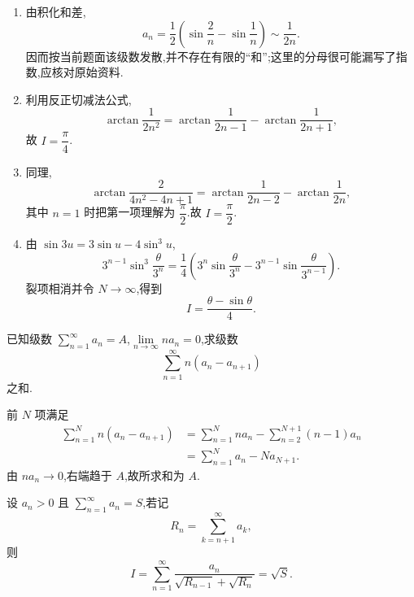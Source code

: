 \begin{solution}
    \leavevmode
    \begin{enumerate}
        \item 由积化和差,
              \[
                  a_n=\dfrac{1}{2}\left(\sin\dfrac{2}{n}-\sin\dfrac{1}{n}\right)
                  \sim\dfrac{1}{2n}.
              \]
              因而按当前题面该级数发散,并不存在有限的``和'';这里的分母很可能漏写了指数,应核对原始资料.
        \item 利用反正切减法公式,
              \[
                  \arctan\dfrac{1}{2n^2}
                  =\arctan\dfrac{1}{2n-1}-\arctan\dfrac{1}{2n+1},
              \]
              故 $I=\boxed{\dfrac{\pi}{4}}$.
        \item 同理,
              \[
                  \arctan\dfrac{2}{4n^2-4n+1}
                  =\arctan\dfrac{1}{2n-2}-\arctan\dfrac{1}{2n},
              \]
              其中 $n=1$ 时把第一项理解为 $\dfrac{\pi}{2}$.故 $I=\boxed{\dfrac{\pi}{2}}$.
        \item 由 $\sin3u=3\sin u-4\sin^3u$,
              \[
                  3^{n-1}\sin^3\dfrac{\theta}{3^n}
                  =\dfrac{1}{4}\left(3^n\sin\dfrac{\theta}{3^n}
                  -3^{n-1}\sin\dfrac{\theta}{3^{n-1}}\right).
              \]
              裂项相消并令 $N\to\infty$,得到
              \[
                  I=\boxed{\dfrac{\theta-\sin\theta}{4}}.
              \]
    \end{enumerate}
\end{solution}

\begin{example}
    已知级数 $\displaystyle\sum\limits_{n=1}^{\infty}a_n=A$,$\displaystyle\lim\limits_{n\to\infty}na_n=0$,求级数
    \[
        \displaystyle\sum\limits_{n=1}^{\infty}n(a_n-a_{n+1})
    \]
    之和.
\end{example}
\exampleblank

\begin{solution}
    前 $N$ 项满足
    \[
        \begin{aligned}
            \sum\limits_{n=1}^{N}n(a_n-a_{n+1})
             & =\sum\limits_{n=1}^{N}na_n-
            \sum\limits_{n=2}^{N+1}(n-1)a_n        \\
             & =\sum\limits_{n=1}^{N}a_n-Na_{N+1}.
        \end{aligned}
    \]
    由 $na_n\to0$,右端趋于 $A$,故所求和为 $\boxed A$.
\end{solution}

\begin{example}
    设 $a_n>0$ 且 $\displaystyle\sum\limits_{n=1}^{\infty}a_n=S$,若记
    \[
        R_n=\sum\limits_{k=n+1}^{\infty}a_k,
    \]
    则
    \[
        I=\sum\limits_{n=1}^{\infty}\dfrac{a_n}{\sqrt{R_{n-1}}+\sqrt{R_n}}=\sqrt{S}.
    \]
\end{example}
\exampleblank

